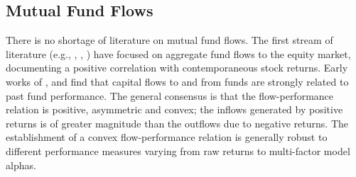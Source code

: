 
\subsection{Mutual Fund Flows}
 There is no shortage of literature on mutual fund flows. The first stream of literature (e.g., \citet{warther1995aggregate}, \citet{edelen2001aggregate}, \citet{brown2003investor}) have focused on aggregate fund flows to the equity market, documenting a positive correlation with contemporaneous stock returns. Early works of \citet{ippolito1992consumer}, \citet{gruber1996another} and \citet{sirri1998costly} find that capital flows to and from funds are strongly related to past fund performance. The general consensus is that the flow-performance relation is positive, asymmetric and convex; the inflows generated by positive returns is of greater magnitude than the outflows due to negative returns. The establishment of a convex flow-performance relation is generally robust to different performance measures varying from raw returns to multi-factor model alphas.
 
